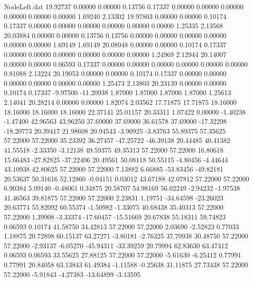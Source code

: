\begin{filecontents}{NodeLeft.dat}
  19.92737    0.00000    0.00000     0.13756    0.17337    0.00000    0.00000    0.00000    0.00000    0.00000    0.00000    1.69240    2.13302
  19.97803    0.00000    0.00000     0.10174    0.17337    0.00000    0.00000    0.00000    0.00000    0.00000    0.00000    1.25335    2.13568
  20.03884    0.00000    0.00000     0.13756    0.13756    0.00000    0.00000    0.00000    0.00000    0.00000    0.00000    1.69149    1.69149
  20.08948    0.00000    0.00000     0.10174    0.17337    0.00000    0.00000    0.00000    0.00000    0.00000    0.00000    1.24969    2.12944
  20.14007    0.00000    0.00000     0.06593    0.17337    0.00000    0.00000    0.00000    0.00000    0.00000    0.00000    0.81088    2.13224
  20.19053    0.00000    0.00000     0.10174    0.17337    0.00000    0.00000    0.00000    0.00000    0.00000    0.00000    1.25473    2.13803
  20.23139    0.00000    0.00000     0.10174    0.17337   -9.97500  -11.20938    1.87000    1.87000    1.87000    1.87000    1.25613    2.14041
  20.28214    0.00000    0.00000     1.82074    2.03562   17.71875   17.71875   18.16000   18.16000   18.16000   18.16000   22.37141   25.01157
  20.33311    1.07422    0.00000    -1.40238   -1.47400   42.96563   43.96250   37.69000   37.69000   36.61578   37.69000  -17.32298  -18.20773
  20.39417   21.98608   20.94543    -3.90925   -3.83763   55.89375   57.35625   57.22000   57.22000   35.23392   36.27457  -47.25722  -46.39138
  20.44485   40.41382   41.55518    -2.33350   -3.12138   49.59375   49.35313   57.22000   57.22000   16.80618   15.66483  -27.82825  -37.22406
  20.49561   50.08118   50.55115    -4.80456   -4.44644   43.10938   42.80625   57.22000   57.22000    7.13882    6.66885  -53.83456  -49.82181
  20.53637   50.31616   52.12860    -0.04151    0.03012   43.67188   42.07812   57.22000   57.22000    6.90384    5.09140   -0.48061    0.34875
  20.58707   54.98169   56.02249    -2.94232   -1.97538   41.46563   39.81875   57.22000   57.22000    2.23831    1.19751  -34.64598  -23.26023
  20.63774   55.82092   60.55374    -1.50982   -1.33075   40.68438   35.40313   57.22000   57.22000    1.39908   -3.33374  -17.60457  -15.51669
  20.67838   55.18311   59.74823     0.06593    0.10174   41.58750   34.42813   57.22000   57.22000    2.03690   -2.52823    0.77033    1.18875
  20.72898   60.15137   63.27271    -3.80181   -2.76325   37.70938   30.48750   57.22000   57.22000   -2.93137   -6.05270  -45.94311  -33.39259
  20.79994   62.83630   63.47412     0.06593    0.06593   33.55625   27.88125   57.22000   57.22000   -5.61630   -6.25412    0.77991    0.77991
  20.84058   63.13843   61.49384    -1.11588   -0.25638   31.11875   27.73438   57.22000   57.22000   -5.91843   -4.27383  -13.64899   -3.13595

\end{filecontents}
